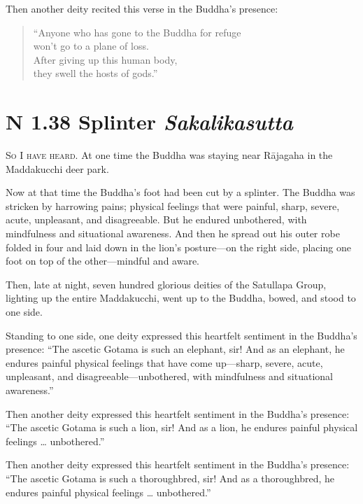 \documentclass[12pt,openany]{book}%
\newcommand*{\suttatitleacronym}[1]{\smaller[2]{#1}\vspace*{.3em}}
\newcommand*{\suttatitletranslation}[1]{\linebreak{#1}}
\newcommand*{\suttatitleroot}[1]{\linebreak\smaller[2]\itshape{#1}}
\newcommand*{\tocacronym}[1]{\hspace*{-3.3em}{#1}\quad}
\newcommand*{\toctranslation}[1]{#1}
\newcommand*{\tocroot}[1]{(\textit{#1})}
\newcommand*{\scevam}[1]{\textsc{#1}}
\begin{document}
Then another deity recited this verse in the Buddha’s presence: 

\begin{verse}%
“Anyone who has gone to the Buddha for refuge \\
won’t go to a plane of loss. \\
After giving up this human body, \\
they swell the hosts of gods.” 

%
\end{verse}

%
\section*{{\suttatitleacronym SN 1.38}{\suttatitletranslation A Splinter }{\suttatitleroot Sakalikasutta}}
\addcontentsline{toc}{section}{\tocacronym{SN 1.38} \toctranslation{A Splinter } \tocroot{Sakalikasutta}}

\scevam{So I have heard. }At one time the Buddha was staying near \textsanskrit{Rājagaha} in the Maddakucchi deer park. 

Now at that time the Buddha’s foot had been cut by a splinter. The Buddha was stricken by harrowing pains; physical feelings that were painful, sharp, severe, acute, unpleasant, and disagreeable. But he endured unbothered, with mindfulness and situational awareness. And then he spread out his outer robe folded in four and laid down in the lion’s posture—on the right side, placing one foot on top of the other—mindful and aware. 

Then, late at night, seven hundred glorious deities of the Satullapa Group, lighting up the entire Maddakucchi, went up to the Buddha, bowed, and stood to one side. 

Standing to one side, one deity expressed this heartfelt sentiment in the Buddha’s presence: “The ascetic Gotama is such an elephant, sir! And as an elephant, he endures painful physical feelings that have come up—sharp, severe, acute, unpleasant, and disagreeable—unbothered, with mindfulness and situational awareness.” 

Then another deity expressed this heartfelt sentiment in the Buddha’s presence: “The ascetic Gotama is such a lion, sir! And as a lion, he endures painful physical feelings … unbothered.” 

Then another deity expressed this heartfelt sentiment in the Buddha’s presence: “The ascetic Gotama is such a thoroughbred, sir! And as a thoroughbred, he endures painful physical feelings … unbothered.” 
\end{document}

